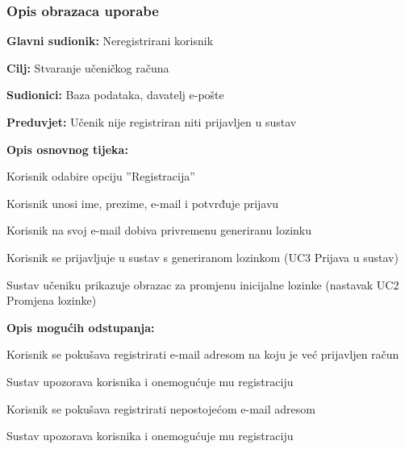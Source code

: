 \subsubsection{Opis obrazaca uporabe}


\noindent {}
\begin{packed_item}

	\item \textbf{Glavni sudionik:} Neregistrirani korisnik
	\item  \textbf{Cilj:} Stvaranje učeničkog računa
	\item  \textbf{Sudionici:} Baza podataka, davatelj e-pošte
	\item  \textbf{Preduvjet:} Učenik nije registriran niti prijavljen u sustav
	\item  \textbf{Opis osnovnog tijeka:}
	
	\item[] \begin{packed_enum}

		\item Korisnik odabire opciju ”Registracija”
		\item Korisnik unosi ime, prezime, e-mail i potvrđuje prijavu
		\item Korisnik na svoj e-mail dobiva privremenu generiranu lozinku
		\item Korisnik se prijavljuje u sustav s generiranom lozinkom (UC3 Prijava u sustav)							
		\item Sustav učeniku prikazuje obrazac za promjenu inicijalne lozinke (nastavak UC2 Promjena lozinke)
	\end{packed_enum}
	
	\item  \textbf{Opis mogućih odstupanja:}
	
	\item[] \begin{packed_item}

		\item[2.a]Korisnik se pokušava registrirati e-mail adresom na koju je već prijavljen račun
		\item[] \begin{packed_enum}
			
			\item Sustav upozorava korisnika i onemogućuje mu registraciju							
		\end{packed_enum}

\item[2.b] Korisnik se pokušava registrirati nepostojećom e-mail adresom
\item[] \begin{packed_enum}

\item Sustav upozorava korisnika i onemogućuje mu registraciju 								
\end{packed_enum}

\end{packed_item}
\end{packed_item}

